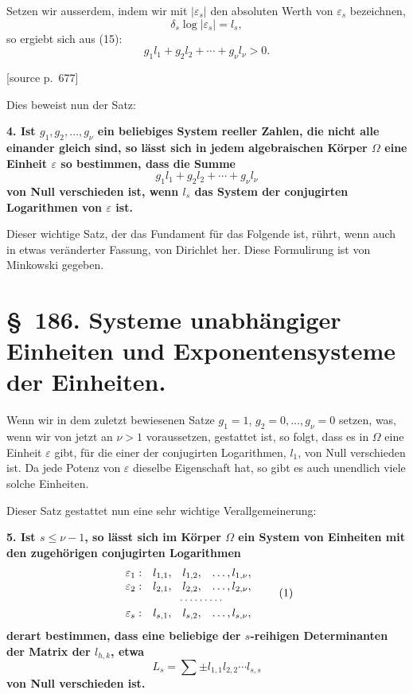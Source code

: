 \documentclass[11pt]{article}
\newcommand{\srcpage}[1]{\par\medskip\noindent\textsf{[source p.~#1]}\par\smallskip}
\begin{document}
Setzen wir ausserdem, indem wir mit $|\varepsilon_s|$ den absoluten Werth von $\varepsilon_s$ bezeichnen,
\begin{equation}
\delta_s\log|\varepsilon_s|=l_s,
\tag{16}
\end{equation}
so ergiebt sich aus (15):
\begin{equation}
g_1l_1+g_2l_2+\cdots+g_\nu l_\nu>0.
\tag{17}
\end{equation}

\srcpage{677}
Dies beweist nun der Satz:

\textbf{4. Ist $g_1,g_2,\ldots,g_\nu$ ein beliebiges System reeller Zahlen, die nicht alle einander gleich sind, so lässt sich in jedem algebraischen Körper $\Omega$ eine Einheit $\varepsilon$ so bestimmen, dass die Summe}
\[
g_1l_1+g_2l_2+\cdots+g_\nu l_\nu
\]
\textbf{von Null verschieden ist, wenn $l_s$ das System der conjugirten Logarithmen von $\varepsilon$ ist.}

Dieser wichtige Satz, der das Fundament für das Folgende ist, rührt, wenn auch in etwas veränderter Fassung, von Dirichlet her. Diese Formulirung ist von Minkowski gegeben.

\section*{\S~186. Systeme unabhängiger Einheiten und Exponentensysteme der Einheiten.}

Wenn wir in dem zuletzt bewiesenen Satze $g_1=1$, $g_2=0,\ldots,g_\nu=0$ setzen, was, wenn wir von jetzt an $\nu>1$ voraussetzen, gestattet ist, so folgt, dass es in $\Omega$ eine Einheit $\varepsilon$ gibt, für die einer der conjugirten Logarithmen, $l_1$, von Null verschieden ist. Da jede Potenz von $\varepsilon$ dieselbe Eigenschaft hat, so gibt es auch unendlich viele solche Einheiten.

Dieser Satz gestattet nun eine sehr wichtige Verallgemeinerung:

\textbf{5. Ist $s\leq \nu-1$, so lässt sich im Körper $\Omega$ ein System von Einheiten mit den zugehörigen conjugirten Logarithmen}
\begin{equation}
\begin{array}{cccc}
\varepsilon_1: & l_{1,1},&l_{1,2},&\ldots,l_{1,\nu},\\
\varepsilon_2: & l_{2,1},&l_{2,2},&\ldots,l_{2,\nu},\\
&\multicolumn{3}{c}{\cdots\cdots\cdots}\,\\
\varepsilon_s: & l_{s,1},&l_{s,2},&\ldots,l_{s,\nu},
\end{array}
\tag{1}
\end{equation}
\textbf{derart bestimmen, dass eine beliebige der $s$-reihigen Determinanten der Matrix der $l_{h,k}$, etwa}
\[
L_s=\sum \pm l_{1,1}l_{2,2}\cdots l_{s,s}
\]
\textbf{von Null verschieden ist.}
\end{document}
